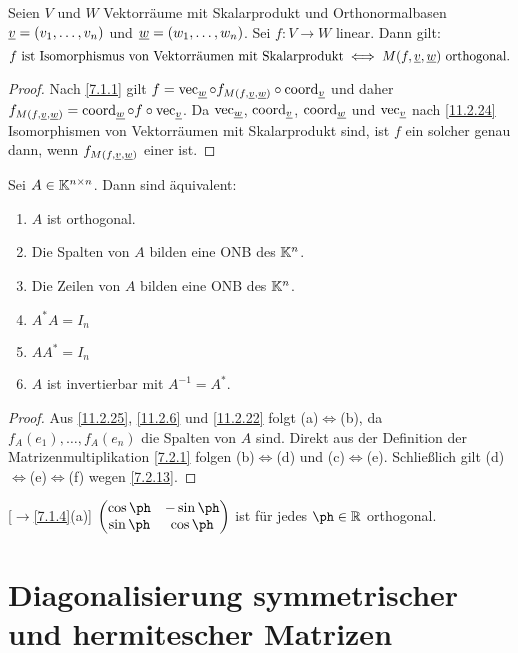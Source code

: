 \documentclass[../../main.tex]{subfiles}
\begin{document}
\begin{sat}\label{11.2.26}
Seien $V$ und $W$ Vektorräume mit Skalarprodukt und Orthonormalbasen ${\underline v}=(v_1,\dots,v_n)$ und ${\underline w}=(w_1,\dots,w_n)$. Sei $f\colon V\to W$ linear. Dann gilt:
\[\text{$f$ ist Isomorphismus von Vektorräumen mit Skalarprodukt}\iff\text{$M(f,{\underline v},{\underline w})$ orthogonal}.\]
\end{sat}

\begin{proof}
Nach \ref{7.1.1} gilt $f=\operatorname{vec}_{\underline w}\circ f_{M(f,{\underline v},{\underline w})}\circ\operatorname{coord}_{\underline v}$ und daher $f_{M(f,{\underline v},{\underline w})}=\operatorname{coord}_{\underline w}\circ f\circ\operatorname{vec}_{\underline v}$. Da $\operatorname{vec}_{\underline w}$, $\operatorname{coord}_{\underline v}$, $\operatorname{coord}_{\underline w}$ und $\operatorname{vec}_{\underline v}$ nach \ref{11.2.24}
Isomorphismen von Vektorräumen mit Skalarprodukt sind, ist $f$ ein solcher genau dann, wenn $f_{M(f,{\underline v},{\underline w})}$ einer ist.
\end{proof}

\begin{sat}\label{11.2.27}
Sei $A\in\mathbb K^{n\times n}$. Dann sind äquivalent:
\begin{enumerate}[\rm(a)]
\item $A$ ist orthogonal.
\item Die Spalten von $A$ bilden eine ONB des $\mathbb K^n$.
\item Die Zeilen von $A$ bilden eine ONB des $\mathbb K^n$.
\item $A^*A=I_n$
\item $AA^*=I_n$
\item $A$ ist invertierbar mit $A^{-1}=A^*$.
\end{enumerate}
\end{sat}

\begin{proof}
Aus \ref{11.2.25}, \ref{11.2.6} und \ref{11.2.22} folgt (a)$\iff$(b), da $f_A(e_1),\dots,f_A(e_n)$ die Spalten von $A$ sind. Direkt aus der Definition der Matrizenmultiplikation
\ref{7.2.1} folgen (b)$\iff$(d) und (c)$\iff$(e). Schließlich gilt (d)$\iff$(e)$\iff$(f) wegen \ref{7.2.13}.
\end{proof}

\begin{bsp}\label{11.2.28}\mbox{}{\rm[$\to$\ref{7.1.4}(a)]}
$\begin{pmatrix}\cos\ph&-\sin\ph\\\sin\ph&\cos\ph\end{pmatrix}$ ist für jedes $\ph\in\R$ orthogonal.
\end{bsp}

\section{Diagonalisierung symmetrischer und hermitescher Matrizen}
\end{document}
